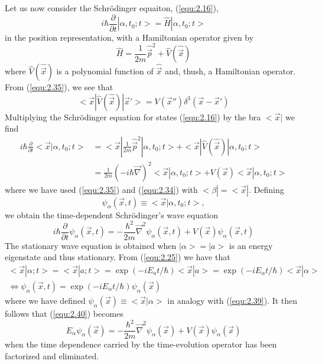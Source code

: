 Let us now consider the Schrödinger equaiton,
(\ref{equ:2.16}),
$$
  i\hbar \frac{\partial}{\partial t} |\alpha,t_0;t> =
  \hat{H}|\alpha,t_0;t>
$$
in the position representation, with a Hamiltonian operator
given by
\begin{equation}
  \hat{H} = \frac{1}{2m} \hat{\vec{p}}^2 +
  \hat{V}(\hat{\vec{x}})
  \label{equ:2.36}
\end{equation}
where $\hat{V}(\hat{\vec{x}})$ is a polynomial function of
$\hat{\vec{x}}$ and, thush, a Hamiltonian operator. From
(\ref{equ:2.35}), we see that
\begin{equation}
  <\vec{x}|\hat{V}(\hat{\vec{x}})|\vec{x}'> =
  V(\vec{x}'')\delta^3(\vec{x}-\vec{x}')
  \label{equ:2.37}
\end{equation}
Multiplying the Schrödinger equation for states
(\ref{equ:2.16}) by the bra $<\vec{x}|$ we find
\begin{align}
  i\hbar \frac{\partial}{\partial t} <\vec{x}|\alpha,t_0;t>
  &=
  <\vec{x}|\frac{1}{2m} \hat{\vec{p}}^2 |\alpha,t_0;t> +
  <\vec{x}|\hat{V}(\hat{\vec{x}})|\alpha,t_0;t>\nonumber\\
  &=
  \frac{1}{2m}(-i\hbar \vec{\nabla})^2
  <\vec{x}|\alpha,t_0;t> + V(\vec{x}) <\vec{x}|\alpha,t_0;t>
  \label{equ:2.38}
\end{align}
where we have used (\ref{equ:2.35}) and (\ref{equ:2.34})
with $<\beta| = <\vec{x}|$. Defining
\begin{equation}
  \psi_{\alpha} (\vec{x},t) \equiv <\vec{x}|\alpha,t_0;t>,
  \label{equ:2.39}
\end{equation}
we obtain the time-dependent Schrödinger's wave equation
\begin{equation}
  i\hbar \frac{\partial}{\partial t}
  \psi_{\alpha}(\vec{x},t) =
  -\frac{\hbar^2}{2m} \vec{\nabla}^2 \psi_{\alpha}
  (\vec{x},t) +
  V(\vec{x}) \psi_{\alpha}(\vec{x},t)
  \label{equ:2.40}
\end{equation}
The stationary wave equation is obtained when $|\alpha> =
|a>$ is an energy eigenstate and thus stationary. From
(\ref{equ:2.25}) we have that
\begin{align}
  <\vec{x}|\alpha;t> = <\vec{x}|a;t> = \exp(-i E_a t/\hbar)
  <\vec{x}|a> = \exp(-i E_{\alpha}t /\hbar)
  <\vec{x}|\alpha>\nonumber\\
  \Leftrightarrow \psi_{\alpha}(\vec{x},t) = \exp(-i
  E_{\alpha} t/\hbar) \psi_{\alpha}(\vec{x})
  \label{equ:2.41}
\end{align}
where we have defined $\psi_{\alpha}(\vec{x}) \equiv
<\vec{x}|\alpha>$ in analogy with (\ref{equ:2.39}).
It then follows that (\ref{equ:2.40}) becomes
\begin{equation}
  E_{\alpha} \psi_{\alpha} (\vec{x}) = - \frac{\hbar^2}{2m}
  \vec{\nabla}^2 \psi_{\alpha} (\vec{x}) + V(\vec{x})
  \psi_{\alpha} (\vec{x})
  \label{equ:2.42}
\end{equation}
when the time dependence carried by the time-evolution
operator has been factorized and eliminated.

